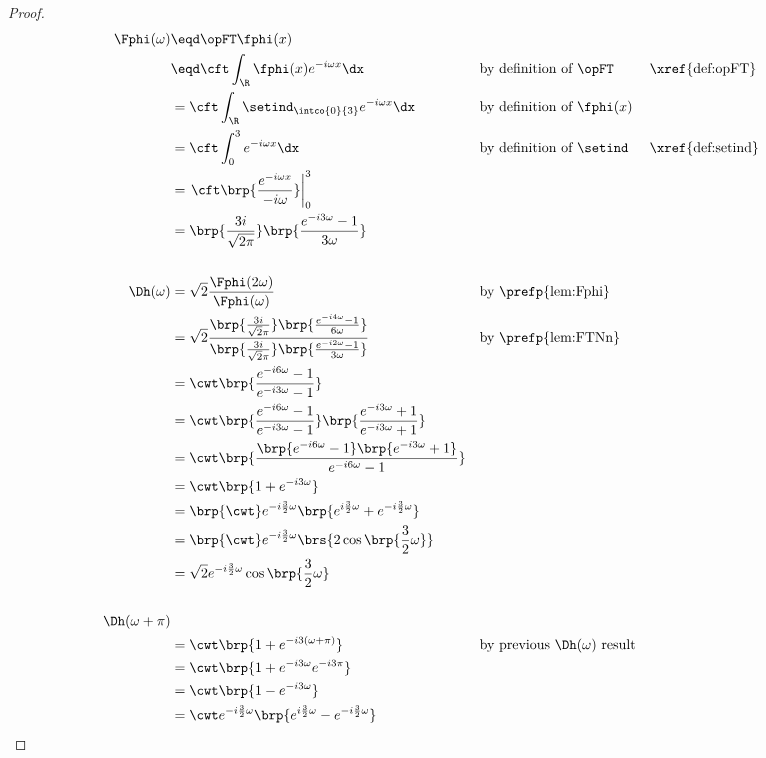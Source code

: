 \begin{proof}
\begin{align*}
  \Fphi(\omega)
    &\eqd \opFT\fphi(x)
  \\&\eqd \cft\int_\R \fphi(x) e^{-i\omega x} \dx
    &&    \text{by definition of $\opFT$}
    &&    \text{\xref{def:opFT}}
  \\&=    \cft\int_\R \setind_\intco{0}{3} e^{-i\omega x} \dx
    &&    \text{by definition of $\fphi(x)$}
  \\&=    \cft\int_0^3  e^{-i\omega x} \dx
    &&    \text{by definition of $\setind$}
    &&    \text{\xref{def:setind}}
  \\&=    \left.\cft\brp{\frac{e^{-i\omega x}}{-i\omega}}\right|_0^3
  \\&=    \brp{\frac{3i}{\sqrt{2\pi}}}\brp{\frac{e^{-i3\omega}-1}{3\omega}}
  \\
  \\
  \Dh(\omega)
    &= \sqrt{2}\frac{\Fphi(2\omega)}{\Fphi(\omega)}
    && \text{by \prefp{lem:Fphi}}
  \\&= \sqrt{2}\frac{\brp{\frac{3i}{\sqrt{2}\pi}}\brp{\frac{e^{-i4\omega}-1}{6\omega}}}
                    {\brp{\frac{3i}{\sqrt{2}\pi}}\brp{\frac{e^{-i2\omega}-1}{3\omega}}}
    && \text{by \prefp{lem:FTNn}}
  \\&= \cwt
       \brp{\frac{e^{-i6\omega}-1}{e^{-i3\omega}-1}}
  \\&= \cwt
       \brp{\frac{e^{-i6\omega}-1}{e^{-i3\omega}-1}}
       \brp{\frac{e^{-i3\omega}+1}{e^{-i3\omega}+1}}
  \\&= \cwt
       \brp{\frac{ \brp{e^{-i6\omega}-1}  \brp{e^{-i3\omega}+1}}{e^{-i6\omega}-1}}
  \\&= \cwt\brp{1+e^{-i3\omega}}
  \\&= \brp{\cwt} e^{-i\frac{3}{2}\omega}\brp{e^{i\frac{3}{2}\omega}+e^{-i\frac{3}{2}\omega}}
  \\&= \brp{\cwt} e^{-i\frac{3}{2}\omega}\brs{2\cos\brp{\frac{3}{2}\omega}}
  \\&= \sqrt{2} e^{-i\frac{3}{2}\omega}\cos\brp{\frac{3}{2}\omega}
  \\
  \\
  \Dh(\omega+\pi)
  \\&= \cwt\brp{1+e^{-i3(\omega+\pi)}}
    && \text{by previous $\Dh(\omega)$ result}
  \\&= \cwt\brp{1+e^{-i3\omega}e^{-i3\pi}}
  \\&= \cwt\brp{1-e^{-i3\omega}}
  \\&= \cwt e^{-i\frac{3}{2}\omega}\brp{e^{i\frac{3}{2}\omega}-e^{-i\frac{3}{2}\omega}}

\end{align*}
\end{proof}
